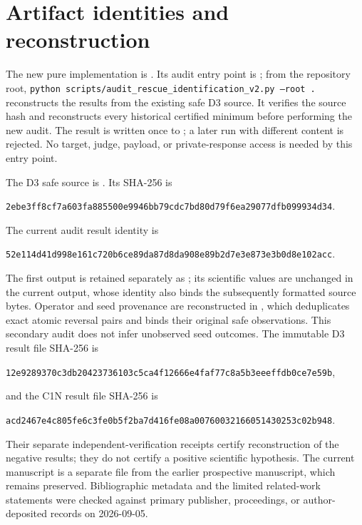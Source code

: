 \documentclass{article}
\begin{document}
\section{Artifact identities and reconstruction}
\label{app:artifacts}

The new pure implementation is
. Its audit entry point is
; from the repository root,
\texttt{python scripts/audit\_rescue\_identification\_v2.py --root .}
reconstructs the results from the existing safe D3 source. It verifies the
source hash and reconstructs every historical certified minimum before
performing the new audit. The result is written once to
;
a later run with different content is rejected. No target, judge, payload,
or private-response access is needed by this entry point.

The D3 safe source is
.
Its SHA-256 is
\begin{center}\scriptsize
\texttt{2ebe3ff8cf7a603fa885500e9946bb79cdc7bd80d79f6ea29077dfb099934d34}.
\end{center}
The current audit result identity is
\begin{center}\scriptsize
\texttt{52e114d41d998e161c720b6ce89da87d8da908e89b2d7e3e873e3b0d8e102acc}.
\end{center}
The first output is retained separately as ;
its scientific values are unchanged in the current output, whose identity
also binds the subsequently formatted source bytes. Operator and seed
provenance are reconstructed in
,
which deduplicates exact atomic reversal pairs and binds their original safe
observations. This secondary audit does not infer unobserved seed outcomes.
The immutable D3 result file SHA-256 is
\begin{center}\scriptsize
\texttt{12e9289370c3db20423736103c5ca4f12666e4faf77c8a5b3eeeffdb0ce7e59b},
\end{center}
and the C1N result file SHA-256 is
\begin{center}\scriptsize
\texttt{acd2467e4c805fe6c3fe0b5f2ba7d416fe08a00760032166051430253c02b948}.
\end{center}
Their separate independent-verification receipts certify reconstruction of
the negative results; they do not certify a positive scientific hypothesis.
The current manuscript is a separate file from the earlier prospective
manuscript, which remains preserved. Bibliographic metadata and the limited
related-work statements were checked against primary publisher, proceedings,
or author-deposited records on 2026-09-05.
\end{document}
